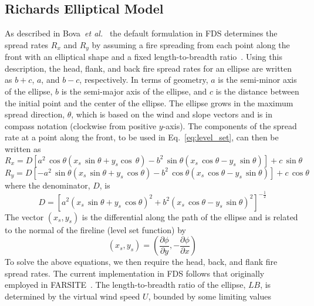 \subsection{Richards Elliptical Model}

As described in Bova~\textit{et al.}~\cite{Bova:IJWF2015} the default formulation in FDS determines the spread rates $R_x$ and $R_y$ by assuming a fire spreading from each point along the front with an elliptical shape and a fixed length-to-breadth ratio~\cite{Richards:1990}. Using this description, the head, flank, and back fire spread rates for an ellipse are written as $b+c$, $a$, and $b-c$, respectively. In terms of geometry, $a$ is the semi-minor axis of the ellipse, $b$ is the semi-major axis of the ellipse, and $c$ is the distance between the initial point and the center of the ellipse. The ellipse grows in the maximum spread direction, $\theta$, which is based on the wind and slope vectors and is in compass notation (clockwise from positive $y$-axis). The components of the spread rate at a point along the front, to be used in Eq.~\ref{eq:level_set}, can then be written as
\begin{equation}
R_{x} = D\left[a^{2} \, \cos \theta\left(x_{s}\, \sin \theta+y_{s} \cos \, \theta\right)-b^{2} \,\sin \theta\left(x_{s} \,\cos \theta - 
y_{s} \, \sin \theta\right)\right]+ c \, \sin \theta
\end{equation}
\begin{equation}
R_{y} = D\left[-a^{2} \, \sin \theta\left(x_{s} \, \sin \theta+y_{s} \, \cos \theta\right)-b^{2} \, \cos \theta\left(x_{s} \, \cos \theta - 
y_{s} \, \sin \theta\right)\right]+c \, \cos \theta
\end{equation}
where the denominator, $D$, is
\begin{equation}
D = \left[a^{2}\left(x_{s} \, \sin \theta+y_{s} \, \cos \theta\right)^{2}+b^{2}\left(x_{s} \, \cos \theta-y_{s} \, \sin \theta\right)^{2}\right]^{-\frac{1}{2}}
\end{equation}
The vector $(x_s,y_s)$ is the differential along the path of the ellipse and is related to the normal of the fireline (level set function) by
\begin{equation}
(x_s,y_s) = \left(\frac{\partial\phi}{\partial y}, -\frac{\partial\phi}{\partial x} \right)
\end{equation}
To solve the above equations, we then require the head, back, and flank fire spread rates. The current implementation in FDS follows that originally employed in FARSITE~\cite{Finney:FARSITE}. The length-to-breadth ratio of the ellipse, $L B$, is determined by the virtual wind speed $U$, bounded by some limiting values
